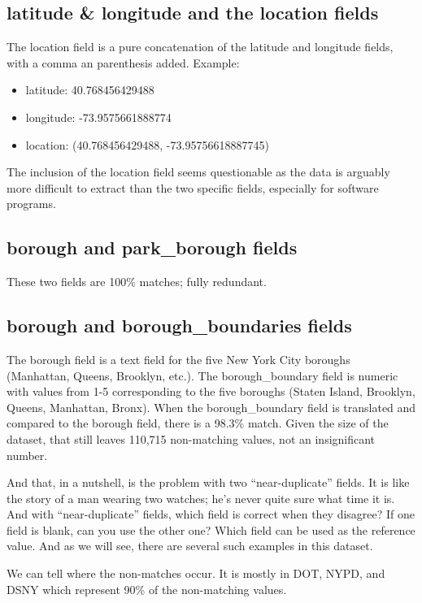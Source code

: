 \documentclass[12pt, titlepage]{article}
\begin{document}
\subsection{latitude \& longitude and the location fields}  The location field is a pure concatenation of the latitude and longitude fields, 
with a comma an parenthesis added. Example:  

	\begin{itemize}
		\item  latitude: 40.768456429488
		\item  longitude: -73.9575661888774
		\item  location: (40.768456429488, -73.95756618887745)
	\end{itemize}

The inclusion of the location field seems questionable as the data is arguably more difficult to extract than the two specific fields, especially for
software programs.

\subsection{borough and park\_borough fields}  These two fields are 100\% matches; fully redundant.

\subsection{borough and borough\_boundaries fields}  The borough field is a text field for the five New York City boroughs (Manhattan, Queens, Brooklyn, etc.).
The borough\_boundary field is numeric with values from 1-5 corresponding to the five boroughs (Staten Island, Brooklyn, Queens, Manhattan, Bronx).
When the borough\_boundary field is translated and compared to the borough field, there is a 98.3\% match. Given the size of the dataset, that 
still leaves 110,715 non-matching values, not an insignificant number.  

And that, in a nutshell, is the problem with two ``near-duplicate'' fields. It is like the  story of a man wearing two watches; he's never
quite sure what time it is. And with ``near-duplicate'' fields, which field is correct when they disagree? 
If one field is blank, can you use the other one? Which field can be used as the reference value.
 And as we will see, there are several such examples in this dataset.

We can tell where the non-matches occur. It is mostly in DOT, NYPD, and DSNY which represent 90\% of the non-matching values.
\end{document}
